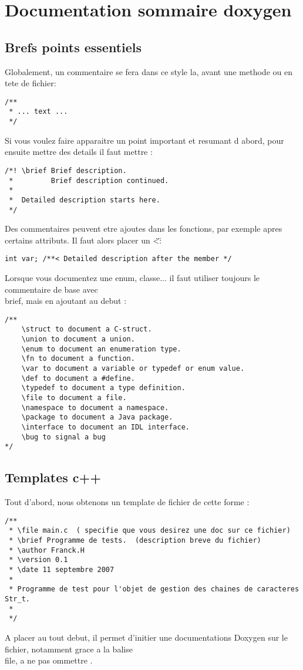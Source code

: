 \chapter{Documentation sommaire doxygen}

\section{Brefs points essentiels}

Globalement, un commentaire se fera dans ce style la, avant une methode ou en tete de fichier:
\begin{lstlisting}
/**
 * ... text ...
 */
 \end{lstlisting}

Si vous voulez faire apparaitre un point important et resumant d abord, pour ensuite mettre des details il faut mettre :
\begin{lstlisting} 
/*! \brief Brief description.
 *         Brief description continued.
 *
 *  Detailed description starts here.
 */
 \end{lstlisting}

Des commentaires peuvent etre ajoutes dans les fonctions, par exemple apres certains attributs. Il faut alors placer un \"<\" :
\begin{lstlisting}
int var; /**< Detailed description after the member */
\end{lstlisting}

\label{balises}Lorsque vous documentez une enum, classe... il faut utiliser toujours le commentaire de base avec \\brief, mais en ajoutant au debut :
 \begin{lstlisting}
/**
    \struct to document a C-struct.
    \union to document a union.
    \enum to document an enumeration type.
    \fn to document a function.
    \var to document a variable or typedef or enum value.
    \def to document a #define.
    \typedef to document a type definition.
    \file to document a file.
    \namespace to document a namespace.
    \package to document a Java package.
    \interface to document an IDL interface.
    \bug to signal a bug
*/
 \end{lstlisting}


\section{Templates c++}

Tout d'abord, nous obtenons un template de fichier de cette forme :
\begin{lstlisting}
/**
 * \file main.c  ( specifie que vous desirez une doc sur ce fichier)
 * \brief Programme de tests.  (description breve du fichier)
 * \author Franck.H
 * \version 0.1
 * \date 11 septembre 2007
 *
 * Programme de test pour l'objet de gestion des chaines de caracteres Str_t.
 *
 */\end{lstlisting}
A placer au tout debut, il permet d'initier une documentations Doxygen sur le fichier, notamment grace a la balise \\file, a ne pas ommettre .





